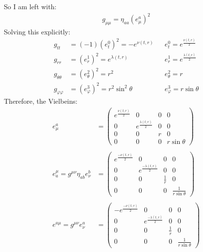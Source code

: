 \documentclass[12pt]{article}
\begin{document}
So I am left with:
\begin{align}
  g_{\mu\mu} = \eta_{aa}(e^a_\mu)^2
\end{align}
Solving this explicitly:
\begin{align*}
  g_{tt} &= (-1)(e^0_t)^2 = -e^{\nu(t,r)} &&e^0_t = e^{\frac{\nu(t,r)}{2}} \\
  g_{rr} &= (e^1_r)^2 = e^{\lambda(t,r)} &&e^1_r = e^{\frac{\lambda(t,r)}{2}} \\
  g_{\theta\theta} &= (e^2_\theta)^2 = r^2 &&e^2_\theta = r \\
  g_{\varphi\varphi} &= (e^3_\varphi)^2 = r^2\sin^2{\theta} &&e^3_\varphi = r\sin{\theta}
\end{align*}
Therefore, the Vielbeins:
\begin{align*}
  e^a_\mu &= \begin{pmatrix}
    e^{\frac{\nu(t,r)}{2}} & 0 & 0 & 0 \\
    0 & e^{\frac{\lambda(t,r)}{2}} & 0 & 0 \\
    0 & 0 & r & 0 \\
    0 & 0 & 0 & r\sin{\theta}
  \end{pmatrix} \\ \\
  e^\mu_a = g^{\mu\nu}\eta_{ab}e^b_\nu &=
  \begin{pmatrix}
    e^{\frac{-\nu(t,r)}{2}} & 0 & 0 & 0 \\
    0 & e^{\frac{-\lambda(t,r)}{2}} & 0 & 0 \\
    0 & 0 & \frac{1}{r} & 0 \\
    0 & 0 & 0 & \frac{1}{r\sin{\theta}}
  \end{pmatrix} \\ \\
  e^{a\mu} = g^{\mu\nu}e^a_\nu &=
  \begin{pmatrix}
    -e^{\frac{-\nu(t,r)}{2}} & 0 & 0 & 0 \\
    0 & e^{\frac{-\lambda(t,r)}{2}} & 0 & 0 \\
    0 & 0 & \frac{1}{r} & 0 \\
    0 & 0 & 0 & \frac{1}{r\sin{\theta}}
  \end{pmatrix}
\end{align*}
\end{document}
